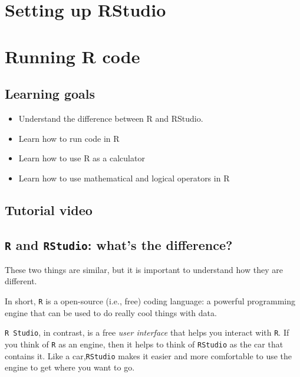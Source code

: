 \documentclass[
]{book}
\providecommand{\tightlist}{%
  \setlength{\itemsep}{0pt}\setlength{\parskip}{0pt}}
\begin{document}
\hypertarget{setting-up-rstudio}{%
\chapter{Setting up RStudio}\label{setting-up-rstudio}}

\hypertarget{running-r-code}{%
\chapter{Running R code}\label{running-r-code}}

\hypertarget{learning-goals}{%
\section*{Learning goals}\label{learning-goals}}

\begin{itemize}
\tightlist
\item
  Understand the difference between R and RStudio.
\item
  Learn how to run code in R
\item
  Learn how to use R as a calculator
\item
  Learn how to use mathematical and logical operators in R
\end{itemize}

\hypertarget{tutorial-video}{%
\section*{Tutorial video}\label{tutorial-video}}

\hypertarget{r-and-rstudio-whats-the-difference}{%
\section*{\texorpdfstring{\texttt{R} and \texttt{RStudio}: what's the difference?}{R and RStudio: what's the difference?}}\label{r-and-rstudio-whats-the-difference}}

These two things are similar, but it is important to understand how they are different.

In short, \texttt{R} is a open-source (i.e., free) coding language: a powerful programming engine that can be used to do really cool things with data.

\texttt{R\ Studio}, in contrast, is a free \emph{user interface} that helps you interact with \texttt{R}. If you think of \texttt{R} as an engine, then it helps to think of \texttt{RStudio} as the car that contains it. Like a car,\texttt{RStudio} makes it easier and more comfortable to use the engine to get where you want to go.
\end{document}
